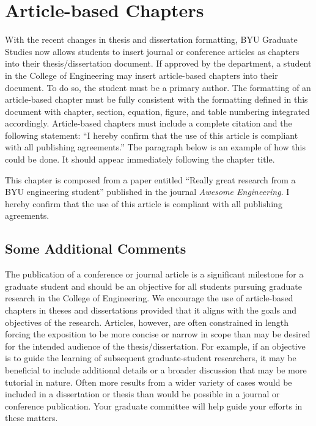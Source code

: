 \chapter{Article-based Chapters}
\label{ch:article_based_chap}

With the recent changes in thesis and dissertation formatting, BYU Graduate Studies now allows students to insert journal or conference articles as chapters into their thesis/dissertation document. If approved by the department, a student in the College of Engineering may insert article-based chapters into their document. To do so, the student must be a primary author. The formatting of an article-based chapter must be fully consistent with the formatting defined in this document with chapter, section, equation, figure, and table numbering integrated accordingly. Article-based chapters must include a complete citation and the following statement: ``I hereby confirm that the use of this article is compliant with all publishing agreements.'' The paragraph below is an example of how this could be done. It should appear immediately following the chapter title.

\vspace{0.1in}
\noindent This chapter is composed from a paper entitled ``Really great research from a BYU engineering student'' published in the journal {\itshape Awesome Engineering}. I hereby confirm that the use of this article is compliant with all publishing agreements.



\section{Some Additional Comments}
The publication of a conference or journal article is a significant milestone for a graduate  student and should be an objective for all students pursuing graduate research in the College of Engineering. We encourage the use of article-based chapters in theses and dissertations provided that it aligns with the goals and objectives of the research. Articles, however, are often constrained in length forcing the exposition to be more concise or narrow in scope than may be desired for the intended audience of the thesis/dissertation. For example, if an objective is to guide the learning of subsequent graduate-student researchers, it may be beneficial to include additional details or a broader discussion that may be more tutorial in nature. Often more results from a wider variety of cases would be included in a dissertation or thesis than would be possible in a journal or conference publication. Your graduate committee will help guide your efforts in these matters.
